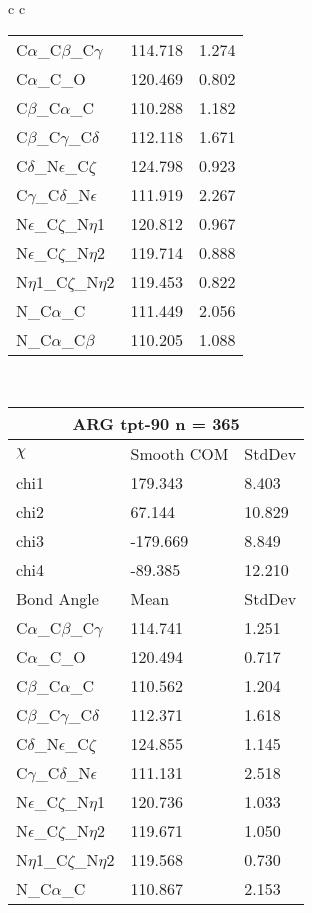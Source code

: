 \begin{longtable}{ c c }
\begin{tabular}{ l l l }
  C$\alpha$\_C$\beta$\_C$\gamma$ & 114.718 & 1.274\\
  C$\alpha$\_C\_O & 120.469 & 0.802\\
  C$\beta$\_C$\alpha$\_C & 110.288 & 1.182\\
  C$\beta$\_C$\gamma$\_C$\delta$ & 112.118 & 1.671\\
  C$\delta$\_N$\epsilon$\_C$\zeta$ & 124.798 & 0.923\\
  C$\gamma$\_C$\delta$\_N$\epsilon$ & 111.919 & 2.267\\
  N$\epsilon$\_C$\zeta$\_N$\eta$1 & 120.812 & 0.967\\
  N$\epsilon$\_C$\zeta$\_N$\eta$2 & 119.714 & 0.888\\
  N$\eta$1\_C$\zeta$\_N$\eta$2 & 119.453 & 0.822\\
  N\_C$\alpha$\_C & 111.449 & 2.056\\
  N\_C$\alpha$\_C$\beta$ & 110.205 & 1.088\\
  \bottomrule
  \end{tabular}
  \\
  \begin{tabular}{ l l l }
  \toprule
  \multicolumn{3}{c}{ARG \textbf{tpt-90} n = 365} \\ \toprule
  $\chi$       & Smooth COM & StdDev \\ \midrule
  chi1 & 179.343 & 8.403 \\ 
  chi2 & 67.144 & 10.829 \\ 
  chi3 & -179.669 & 8.849 \\ 
  chi4 & -89.385 & 12.210 \\ \midrule
  Bond Angle   & Mean     & StdDev \\ \midrule
  C$\alpha$\_C$\beta$\_C$\gamma$ & 114.741 & 1.251\\
  C$\alpha$\_C\_O & 120.494 & 0.717\\
  C$\beta$\_C$\alpha$\_C & 110.562 & 1.204\\
  C$\beta$\_C$\gamma$\_C$\delta$ & 112.371 & 1.618\\
  C$\delta$\_N$\epsilon$\_C$\zeta$ & 124.855 & 1.145\\
  C$\gamma$\_C$\delta$\_N$\epsilon$ & 111.131 & 2.518\\
  N$\epsilon$\_C$\zeta$\_N$\eta$1 & 120.736 & 1.033\\
  N$\epsilon$\_C$\zeta$\_N$\eta$2 & 119.671 & 1.050\\
  N$\eta$1\_C$\zeta$\_N$\eta$2 & 119.568 & 0.730\\
  N\_C$\alpha$\_C & 110.867 & 2.153\\

\end{tabular}
\end{longtable}
